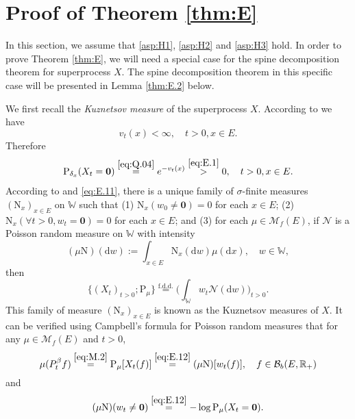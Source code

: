 \documentclass[12pt,a4paper]{amsart}
\numberwithin{equation}{section}
\theoremstyle{plain}
\theoremstyle{definition}
\theoremstyle{remark}
\begin{document}
	\section{Proof of Theorem \ref{thm:E}} \label{sec:E}
	In this section, we assume that \eqref{asp:H1}, \eqref{asp:H2} and \eqref{asp:H3} hold.
	In order to prove Theorem \ref{thm:E}, we will need a special case for the spine decomposition theorem for superprocess $X$.
	The spine decomposition theorem in this specific case will be presented in Lemma \ref{thm:E.2} below.
	
	We first recall the \emph{Kuznetsov  measure} of the superprocess $X$.
	According to \cite[Proposition 1.3]{LiuRenSongSun2020} we have
\begin{equation} \label{eq:E.1}
	v_t(x)<\infty, \quad t>0, x\in E.
\end{equation}
	Therefore
\begin{align} \label{eq:E.11}
	\mathrm P_{\delta_x}(X_t = \mathbf 0) \overset{\eqref{eq:Q.04}}= e^{-v_t(x)}\overset{\eqref{eq:E.1}} > 0, \quad t>0, x\in E.
\end{align}
	According to \cite[Section 8.4]{Li2011Measure-valued} and \eqref{eq:E.11}, there is a unique family of $\sigma$-finite measures
	$(\mathrm N_x)_{x\in E}$
	on $\mathbb W$ such that
	(1) $\mathrm N_x(w_0 \neq \mathbf 0) = 0$ for each $x\in E$;
	(2) $\mathrm N_x (\forall t > 0, w_t =\mathbf 0) =0$ for each $x\in E$;
	and (3) for each $\mu \in \mathcal M_f(E)$, if $\mathcal N$ is a Poisson random measure on $\mathbb W$ with intensity
	\[
	(\mu\mathrm N)(\mathrm dw):= 
	\int_{x\in E} \mathrm N_x(\mathrm dw)\mu(\mathrm dx), \quad w\in \mathbb W,
	\]
	then
	\begin{equation} \label{eq:E.12}
	\{(X_t)_{t> 0};\mathrm P_\mu\}
	\overset{\text{f.d.d.}}= \Big(\int_{\mathbb W} w_t\mathcal N(\mathrm dw)\Big)_{t> 0}.
	\end{equation}
	This family of measure $(\mathrm N_x)_{x\in E}$ is known as the Kuznetsov measures of $X$.
	It can be verified using Campbell's formula for Poisson random measures that for any $\mu\in \mathcal M_f(E)$ and $t>0$,
\begin{equation} \label{eq:E.13}
	\mu(P_t^\beta f)
	\overset{\eqref{eq:M.2}}= \mathrm P_\mu[X_t(f)]
	\overset{\eqref{eq:E.12}}=(\mu \mathrm N) [w_t(f)],
	\quad f\in \mathcal B_b(E, \mathbb R_+)
\end{equation}
	and
\begin{equation} \label{eq:E.14}
	(\mu\mathrm N) (w_t\neq \mathbf 0)
	\overset{\eqref{eq:E.12}} = - \log \mathrm P_{\mu}(X_t = \mathbf 0).
\end{equation}
\end{document}
